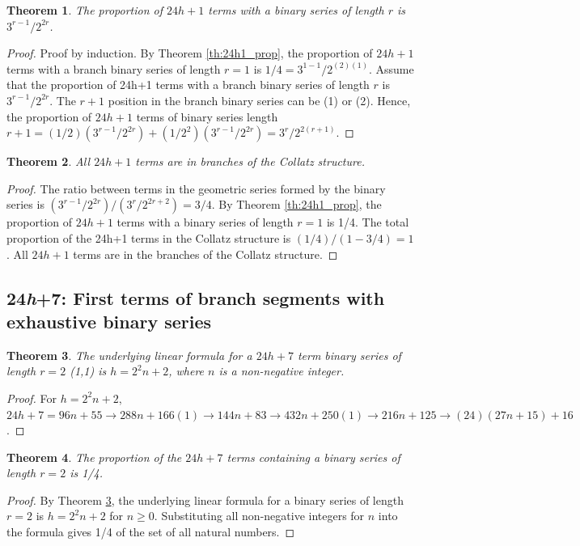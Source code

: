 \documentclass[sn-mathphys-num, pdflatex]{sn-jnl}
\newtheorem{theorem}{Theorem}[section]
\begin{document}
\begin{theorem}
    The proportion of $24h+1$ terms with a binary series of length $r$ is $3^{r-1}/2^{2r}$.
\end{theorem}
\begin{proof}
    Proof by induction.
    By Theorem \ref{th:24h1_prop}, the proportion of $24h+1$ terms with a branch binary series of length $r=1$ is $1/4 = 3^{1-1}/2^{(2)(1)}$.
    Assume that the proportion of 24h+1 terms with a branch binary series of length $r$ is $3^{r-1}/2^{2r}$.
    The $r+1$ position in the branch binary series can be (1) or (2).
    Hence, the proportion of $24h+1$ terms of binary series length $r+1 = (1/2)(3^{r-1}/2^{2r})+(1/2^2)(3^{r-1}/2^{2r}) = 3^r/2^{2(r+1)}$. 
\end{proof}

\begin{theorem}\label{th:24h1_final}
    All $24h+1$ terms are in branches of the Collatz structure.
\end{theorem}
\begin{proof}
    The ratio between terms in the geometric series formed by the binary series is $(3^{r-1}/2^{2r}) / (3^r/2^{2r+2}) = 3/4$.
    By Theorem \ref{th:24h1_prop}, the proportion of $24h+1$ terms with a binary series of length $r=1$ is 1/4.
    The total proportion of the 24h+1 terms in the Collatz structure is $(1/4)/(1 - 3/4) = 1$.
    All $24h+1$ terms are in the branches of the Collatz structure.
\end{proof}
\subsection{24\textit{h}+7: First terms of branch segments with exhaustive binary series}\label{sec6.6}
\begin{theorem}\label{th:24h7_base}
    The underlying linear formula for a $24h+7$ term binary series of length $r=2$ (1,1) is $h=2^2n+2$, where $n$ is a non-negative integer.
\end{theorem}
\begin{proof}
    For $h=2^2n+2$, $24h+7 = 96n+55\to 288n+166(1)\to 144n+83\to 432n+250(1)\to 216n+125\to (24)(27n+15)+16$.
\end{proof}
\begin{theorem}\label{th:24h7_prop}
    The proportion of the $24h+7$ terms containing a binary series of length $r=2$ is 1/4.
\end{theorem}
\begin{proof}
    By Theorem \ref{th:24h7_base}, the underlying linear formula for a binary series of length $r=2$ is $h=2^2n+2$ for $n \ge 0$. Substituting all non-negative integers for $n$ into the formula gives 1/4 of the set of all natural numbers.
\end{proof}
\end{document}
